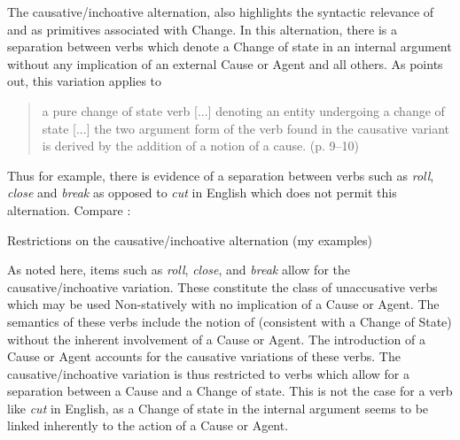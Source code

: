 The causative\slash inchoative alternation, also highlights the syntactic
relevance of \CAUSE and \BECOME as primitives associated with Change.
In this alternation, there is a separation between verbs which denote
a Change of state in an internal argument without any implication of
an external Cause or Agent and all others.  As \citet{Levin1993}
points out, this variation applies to

\begin{quote}
a pure change of state verb [...] denoting an entity undergoing a change
of state [...] the two argument form of the verb found in the causative
variant is derived by the addition of a notion of a cause. (p. 9--10)
\end{quote}

Thus for example, there is evidence of a separation between verbs such
as \textit{roll}, \textit{close} and \textit{break} as opposed to \textit{cut} in English which
does not permit this alternation.  Compare :

\ea%
\label{ex:4:16}
Restrictions on the causative\slash inchoative alternation (my examples)\\
\z \z

As noted here, items such as \textit{roll}, \textit{close},  and \textit{break} allow for the
causative\slash inchoative variation.  These constitute the class of
unaccusative verbs which may be used Non-statively with no implication
of a Cause or Agent.  The semantics of these verbs include the notion
of \BECOME (consistent with a Change of State) without the inherent
involvement of a Cause or Agent.  The introduction of a Cause or Agent
accounts for the causative variations of these verbs.  The
causative\slash inchoative variation is thus restricted to verbs which allow
for a separation between a Cause and a Change of state.  This is not
the case for a verb like \textit{cut} in English, as a Change of state in the
internal argument seems to be linked inherently to the action of a
Cause or Agent.



